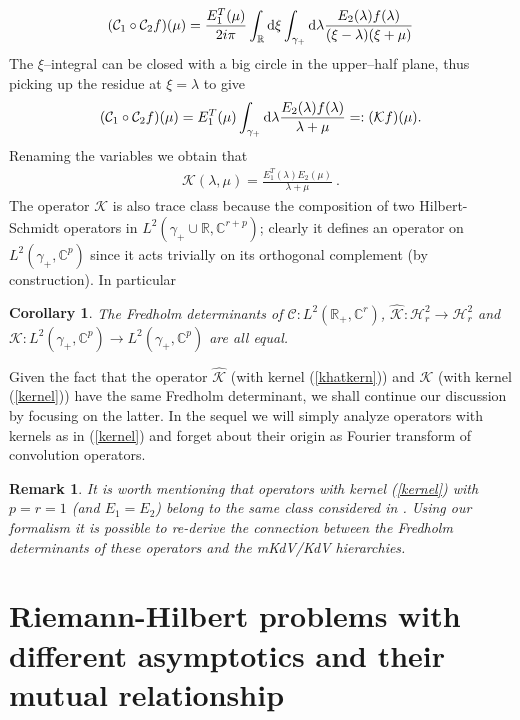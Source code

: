 \documentclass{article}
\newtheorem{cor}{Corollary}[section]
\newtheorem{remark}{Remark}[section]
\def\H{\mathcal H}
\def \C{{\mathbf C}}
\def \K{{\mathcal K}}
\def\C{{\mathbb C}}
\def\R{{\mathbb R}}
\def\d{{\rm d}}
\def\wh{\widehat}
\def\bea{\begin{eqnarray}}
\def\eea{\end{eqnarray}}
\newcommand{\be}{\begin{eqnarray}}
\newcommand{\ee}{\end{eqnarray}}
\begin{document}
\bea
(\mathcal C_1\circ \mathcal C_2 f)(\mu)=\frac { E_1^T(\mu)}{2i\pi}  \int_{\R} \d \xi \int_{\gamma_+} \d\lambda \frac {E_2(\lambda)f(\lambda)}{(\xi - \lambda)(\xi + \mu)} 
\eea
The $\xi$--integral can be closed with a big circle in the upper--half plane, thus picking up the residue at $\xi=\lambda$ to give 
\be
(\mathcal C_1\circ \mathcal C_2 f)(\mu)={ E_1^T(\mu)}\int_{\gamma_+} \d\lambda \frac {E_2(\lambda)f(\lambda)}{\lambda + \mu} =:({\mathcal K} f)(\mu).
\ee
Renaming the variables we obtain that
\be
{\mathcal K}(\lambda,\mu) = \frac {E_1^T(\lambda) E_2(\mu)}{\lambda + \mu}\ . \label{kernel}
\ee
The operator $\mathcal K$ is also trace class because the composition of two Hilbert-Schmidt  operators in $L^2(\gamma_+\cup \R, \C^{r+p})$; clearly it defines an operator on $L^2(\gamma_+,\C^p)$ since it acts trivially on its orthogonal complement (by construction).
In particular 
\begin{cor}\label{cor2.1}
The Fredholm determinants of $\mathcal C:L^2(\R_+,\C^r)$, $\wh \K:\H^2_r\to \H^2_r$ and $\K:L^2(\gamma_+, \C^p)\to L^2(\gamma_+, \C^p)$ are all equal.
\end{cor}

Given the fact that the operator  $\wh \K $ (with kernel (\ref{khatkern}))  and $\K$ (with kernel (\ref{kernel}))
have the same Fredholm determinant, we shall continue our discussion by focusing on the latter.
In the sequel we will simply analyze operators with kernels as in (\ref{kernel}) and forget about their origin as Fourier transform of convolution operators.
\begin{remark}
	It is worth mentioning that operators with kernel (\ref{kernel}) with $p=r=1$ (and $E_1=E_2$) belong to the same class considered in \cite{TWmKdV}. Using our formalism it is possible to re-derive the connection between the Fredholm determinants of these operators and the mKdV/KdV hierarchies.
\end{remark}

\section{Riemann-Hilbert problems with different asymptotics and their mutual relationship}\label{RHPs}
\end{document}
